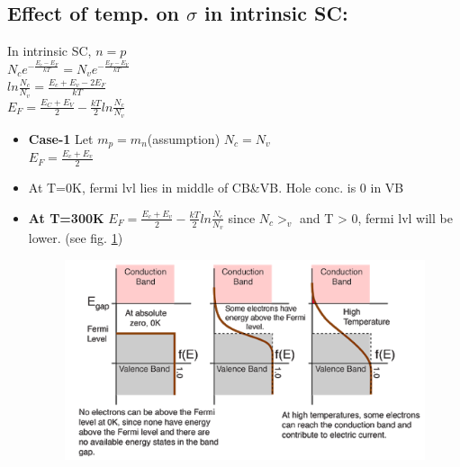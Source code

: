 \documentclass[10pt, a4paper]{report}
\begin{document}
	\subsection{Effect of temp. on $ \sigma $ in intrinsic SC:}
	In intrinsic SC, $ n = p $ \\
	$ N_c  e^{-\frac{E_c-E_F}{kT}}  = N_v e^{-\frac{E_F-E_V}{kT}}$ \\
	$ ln \frac{N_c}{N_v}  = \frac{E_c+E_v-2E_F}{kT}$ \\
	$ E_F = \frac{E_C+E_V}{2} -\frac{kT}{2}ln\frac{N_c}{N_v}$\\
	\begin{itemize}
		\item \textbf{Case-1 } Let $ m_p = m_n $(assumption) $ N_c = N_v $\\
		$ E_F = \frac{E_c + E_v}{2} $ 
		\item At T=0K, fermi lvl lies in middle of CB\&VB. Hole conc. is 0 in VB
		\item \textbf{At T=300K} $ E_F = \frac{E_c+E_v}{2} -\frac{kT}{2} ln \frac{N_c}{N_v}$ since $ N_c > _v $ and T > 0, fermi lvl will be lower. (see fig. \ref{fig:fermilvl})
		\begin{figure}[h]
			\centering
			\includegraphics[width=0.7\linewidth]{img/fermi_lvl}
			\caption{}
			\label{fig:fermilvl}
		\end{figure}		
	\end{itemize}
\end{document}
